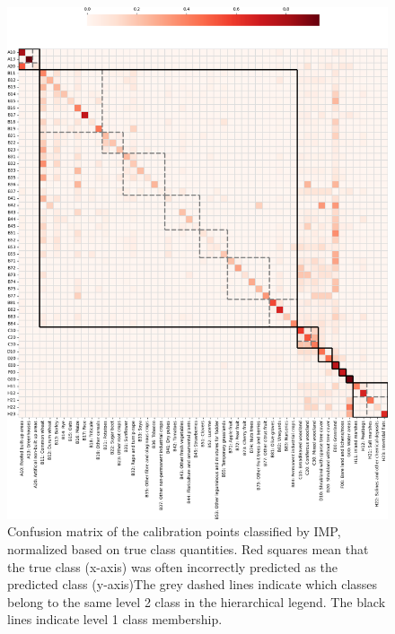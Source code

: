     \begin{figure}
        \centering
        \includegraphics[width=\textwidth]{figs_05/fig_hierarchical_confusion_matrix_calib.png}
        \caption{Confusion matrix of the calibration points classified by IMP, normalized based on true class quantities. Red squares mean that the true class (x-axis) was often incorrectly predicted as the predicted class (y-axis)The grey dashed lines indicate which classes belong to the same level 2 class in the hierarchical legend. The black lines indicate level 1 class membership.}
        \label{fig:05_confusion_matrix_calib}
    \end{figure}

